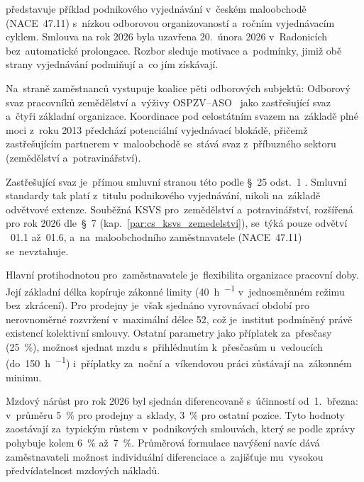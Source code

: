 
představuje příklad podnikového vyjednávání v~českém maloobchodě (\acs{NACE}~47.11) s~nízkou odborovou organizovaností a~ročním vyjednávacím cyklem. Smlouva na rok 2026 byla uzavřena 20.~února 2026 v~Radonicích bez~automatické prolongace. Rozbor sleduje motivace a~podmínky, jimiž obě strany vyjednávání podmiňují a~co jím získávají.\par

Na~straně zaměstnanců vystupuje koalice pěti odborových subjektů: Odborový svaz pracovníků zemědělství a~výživy \acs{OSPZV}--\acs{ASO}~ jako zastřešující svaz a~čtyři základní organizace. Koordinace pod celostátním svazem na~základě plné moci z~roku 2013 předchází potenciální vyjednávací blokádě, přičemž zastřešujícím partnerem v~maloobchodě se~stává svaz z~příbuzného sektoru (zemědělství a~potravinářství).\par

Zastřešující svaz je~přímou smluvní stranou této  podle \mbox{§~25} odst.~1 . Smluvní standardy tak platí z~titulu podnikového vyjednávání, nikoli na~základě odvětvové extenze. Souběžná \acs{KSVS} pro~zemědělství a~potravinářství, rozšířená pro rok 2026 dle~\mbox{§~7}  (kap.~\ref{par:cs_ksvs_zemedelstvi}), se~týká pouze odvětví ~01.1 až~01.6, a~na~maloobchodního zaměstnavatele (NACE~47.11) se~nevztahuje.\par

Hlavní protihodnotou pro~zaměstnavatele je~flexibilita organizace pracovní doby. Její základní délka kopíruje zákonné limity (\SI{40}{\hour\per\week} v~jednosměnném režimu bez~zkrácení). Pro prodejny je~však sjednáno vyrovnávací období pro nerovnoměrné rozvržení v~maximální délce \SI{52}{\week}, což je~institut podmíněný právě existencí kolektivní smlouvy. Ostatní parametry jako příplatek za~přesčasy (\SI{25}{\percent}), možnost sjednat mzdu s~přihlédnutím k~přesčasům u~vedoucích (do~\SI{150}{\hour\per\rok}) i~příplatky za~noční a~víkendovou práci zůstávají na~zákonném minimu.~\cite{zakon_zp_2006}\par

Mzdový nárůst pro rok 2026 byl sjednán diferencovaně s~účinností od~1.~března: v~průměru \SI{5}{\percent} pro prodejny a~sklady, \SI{3}{\percent} pro ostatní pozice. Tyto hodnoty zaostávají za~typickým růstem v~podnikových smlouvách, který se podle zprávy  pohybuje kolem \SI{6}{\percent} až~\SI{7}{\percent}. Průměrová formulace navýšení navíc dává zaměstnavateli možnost individuální diferenciace a~zajišťuje mu~vysokou předvídatelnost mzdových nákladů.\par

